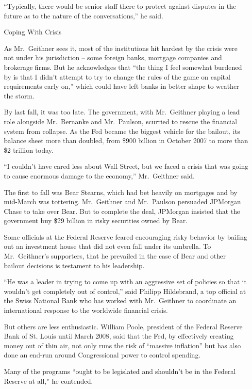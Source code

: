 \documentclass[12pt,a4paper,onecolumn]{article}
\begin{document}
``Typically, there would be senior staff there to protect against disputes in the future as to the
nature of the conversations,'' he said.

Coping With Crisis

As Mr.~Geithner sees it, most of the institutions hit hardest by the crisis were not under his
jurisdiction -- some foreign banks, mortgage companies and brokerage firms. But he acknowledges that
``the thing I feel somewhat burdened by is that I didn't attempt to try to change the rules of the
game on capital requirements early on,'' which could have left banks in better shape to weather the
storm.

By last fall, it was too late. The government, with Mr.~Geithner playing a lead role alongside
Mr.~Bernanke and Mr.~Paulson, scurried to rescue the financial system from collapse. As the Fed
became the biggest vehicle for the bailout, its balance sheet more than doubled, from \$900 billion
in October 2007 to more than \$2 trillion today.

``I couldn't have cared less about Wall Street, but we faced a crisis that was going to cause
enormous damage to the economy,'' Mr.~Geithner said.

The first to fall was Bear Stearns, which had bet heavily on mortgages and by mid-March was
tottering. Mr.~Geithner and Mr.~Paulson persuaded JPMorgan Chase to take over Bear. But to complete
the deal, JPMorgan insisted that the government buy \$29 billion in risky securities owned by Bear.

Some officials at the Federal Reserve feared encouraging risky behavior by bailing out an investment
house that did not even fall under its umbrella. To Mr.~Geithner's supporters, that he prevailed in
the case of Bear and other bailout decisions is testament to his leadership.

``He was a leader in trying to come up with an aggressive set of policies so that it wouldn't get
completely out of control,'' said Philipp Hildebrand, a top official at the Swiss National Bank who
has worked with Mr.~Geithner to coordinate an international response to the worldwide financial
crisis.

But others are less enthusiastic. William Poole, president of the Federal Reserve Bank of St. Louis
until March 2008, said that the Fed, by effectively creating money out of thin air, not only runs
the risk of ``massive inflation'' but has also done an end-run around Congressional power to control
spending.

Many of the programs ``ought to be legislated and shouldn't be in the Federal Reserve at all,'' he
contended.
\end{document}
